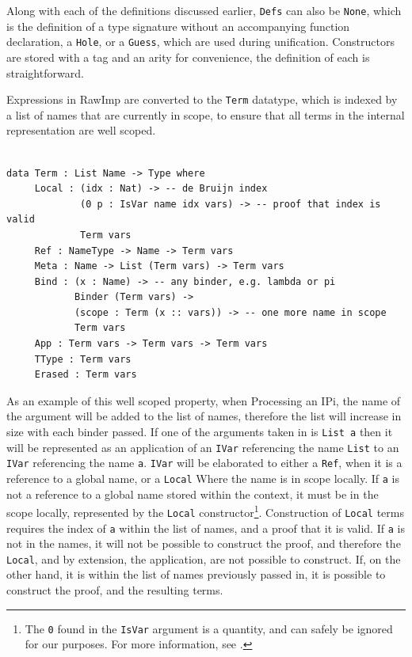 \documentclass[a4paper]{article}
\begin{document}
Along with each of the definitions discussed earlier, \texttt{Defs} can also be
\texttt{None}, which is the definition of a type signature without an 
accompanying function declaration, a \texttt{Hole}, or a \texttt{Guess}, which are used 
during unification. Constructors are stored with a tag and an arity for convenience,
the definition of each is straightforward.

Expressions in RawImp are converted to the \texttt{Term} datatype, which is 
indexed by a list of names that are currently in scope, to ensure that
all terms in the internal representation are well scoped.

\begin{center}
  \begin{verbatim} 
    
data Term : List Name -> Type where
	 Local : (idx : Nat) -> -- de Bruijn index
			 (0 p : IsVar name idx vars) -> -- proof that index is valid
			 Term vars
	 Ref : NameType -> Name -> Term vars 
	 Meta : Name -> List (Term vars) -> Term vars
	 Bind : (x : Name) -> -- any binder, e.g. lambda or pi
			Binder (Term vars) ->
			(scope : Term (x :: vars)) -> -- one more name in scope
			Term vars
	 App : Term vars -> Term vars -> Term vars 
	 TType : Term vars
	 Erased : Term vars
\end{verbatim}
\end{center}

As an example of this well scoped property, when Processing an IPi, the name of the argument will
be added to the list of names, therefore the list will increase in size with
each binder passed. If one of the arguments taken in is \texttt{List a}
then it will be represented as an application of an \texttt{IVar} referencing the name \texttt{List}
to an \texttt{IVar} referencing the name \texttt{a}. \texttt{IVar} will be elaborated
to either a \texttt{Ref}, when it is a reference to a global name, or a \texttt{Local}
Where the name is in scope locally.
 If \texttt{a} is not a reference
to a global name stored within the context, it must be in the scope locally, represented by the
\texttt{Local} constructor\footnote{The \texttt{0} found
in the \texttt{IsVar} argument is a quantity, and can safely be ignored for our purposes.
For more information, see \cite{BibEntry2020Nov}.}. Construction of \texttt{Local} terms requires the index of
\texttt{a} within the list of names, and a proof that it is valid. If \texttt{a} is not
in the names, it will not be possible to construct the proof, and therefore the \texttt{Local},
and by extension, the application, are not possible to construct. If, on the other hand, it is
within the list of names previously passed in, it is possible to construct the proof, and the
resulting terms.
\end{document}
